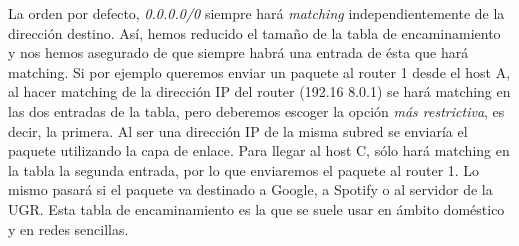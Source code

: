 \documentclass[10pt,a4paper,spanish]{report}
\begin{document}
La orden por defecto, \textit{\textcolor{tema4}{0.0.0.0/0}} siempre hará \textit{\textcolor{tema4}{matching}} independientemente de la dirección destino. Así, hemos reducido el tamaño de la tabla de encaminamiento y nos hemos asegurado de que siempre habrá una entrada de ésta que hará matching. Si por ejemplo queremos enviar un paquete al router 1 desde el host A, al hacer matching de la dirección IP del router (192.16
8.0.1) se hará matching en las dos entradas de la tabla, pero deberemos escoger la opción \textit{\textcolor{tema4}{más restrictiva}}, es decir, la primera. Al ser una dirección IP de la misma subred se enviaría el paquete utilizando la capa de enlace. Para llegar al host C, sólo hará matching en la tabla la segunda entrada, por lo que enviaremos el paquete al router 1. Lo mismo pasará si el paquete va destinado a Google, a Spotify o al servidor de la UGR. Esta tabla de encaminamiento es la que se suele usar en ámbito doméstico y en redes sencillas.
\end{document}
